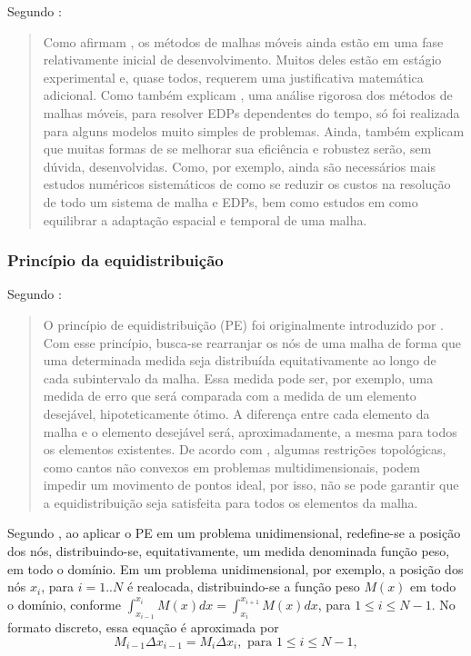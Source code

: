 Segundo : 

\begin{quotation}
Como afirmam , os métodos de malhas móveis ainda estão em uma fase relativamente inicial de desenvolvimento. Muitos deles estão em estágio experimental e, quase todos, requerem uma justificativa matemática adicional. Como também explicam , uma análise rigorosa dos métodos de malhas móveis, para resolver EDPs dependentes do tempo, só foi realizada para alguns modelos muito simples de problemas. Ainda, também explicam que muitas formas de se melhorar sua eficiência e robustez serão, sem dúvida, desenvolvidas. Como, por exemplo, ainda são necessários mais estudos numéricos sistemáticos de como se reduzir os custos na resolução de todo um sistema de malha e EDPs, bem como estudos em como equilibrar a adaptação espacial e temporal de uma malha.
\end{quotation}

\subsubsection{Princípio da equidistribuição}
\label{cap_principio_equidistribuicao}

Segundo :
\begin{quotation}
O princípio de equidistribuição (PE) foi originalmente introduzido por . Com esse princípio, busca-se rearranjar os nós de uma malha de forma que uma determinada medida seja distribuída equitativamente ao longo de cada subintervalo da malha. Essa medida pode ser, por exemplo, uma medida de erro que será comparada com a medida de um elemento
desejável, hipoteticamente ótimo. A diferença entre cada elemento da malha e o elemento desejável será, aproximadamente, a mesma para todos os elementos existentes. De acordo com , algumas restrições topológicas, como cantos não convexos em problemas multidimensionais, podem impedir um movimento de pontos ideal, por isso, não se pode garantir que a equidistribuição seja satisfeita para todos os elementos da malha. 
\end{quotation}

Segundo , ao aplicar o PE em um problema unidimensional, redefine-se a posição dos nós, distribuindo-se, equitativamente, um medida denominada função peso, em todo o domínio. Em um problema unidimensional, por exemplo, a posição dos nós $x_i$, para $i= 1..N$ é realocada, distribuindo-se a função peso $M(x)$ em todo o domínio, conforme $\int_{x_{i-1}}^{x_i} M(x)dx = \int_{x_i}^{x_{i+1}} M(x)dx$, para $1 \leq i \leq N-1$.  No formato discreto, essa equação é aproximada por
\begin{equation}
 M_{i-1} \Delta x_{i-1} = M_i \Delta x_i, \textrm{ para } 1 \leq i \leq N-1,
 \label{funcao_monitora_auxiliar_um}
\end{equation}

